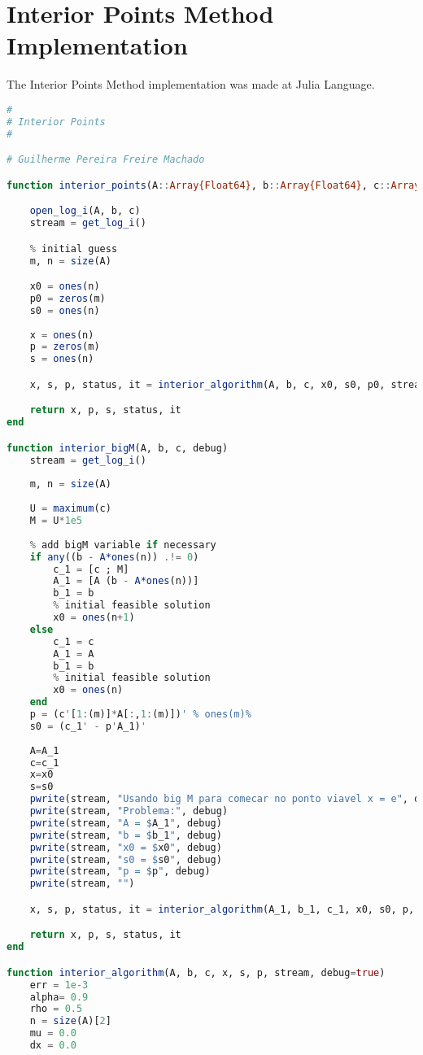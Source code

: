 \documentclass[a4paper]{IEEEtran}
\begin{document}
\section{Interior Points Method Implementation}
\label{appendix:A}

The Interior Points Method implementation was made at Julia Language.
\begin{lstlisting}[language=Julia,numbers=none]
#
# Interior Points
#

# Guilherme Pereira Freire Machado

function interior_points(A::Array{Float64}, b::Array{Float64}, c::Array{Float64}, debug=true)

    open_log_i(A, b, c)
    stream = get_log_i()

    % initial guess
    m, n = size(A)

    x0 = ones(n)
    p0 = zeros(m)
    s0 = ones(n)
    
    x = ones(n)
    p = zeros(m)
    s = ones(n)

    x, s, p, status, it = interior_algorithm(A, b, c, x0, s0, p0, stream, debug)

    return x, p, s, status, it
end

function interior_bigM(A, b, c, debug)
    stream = get_log_i()
    
    m, n = size(A)
    
    U = maximum(c)
    M = U*1e5
    
    % add bigM variable if necessary
    if any((b - A*ones(n)) .!= 0)
        c_1 = [c ; M]
        A_1 = [A (b - A*ones(n))]
        b_1 = b
        % initial feasible solution
        x0 = ones(n+1)
    else
        c_1 = c
        A_1 = A
        b_1 = b
        % initial feasible solution
        x0 = ones(n)
    end
    p = (c'[1:(m)]*A[:,1:(m)])' % ones(m)%
    s0 = (c_1' - p'A_1)'
    
    A=A_1
    c=c_1
    x=x0
    s=s0
    pwrite(stream, "Usando big M para comecar no ponto viavel x = e", debug)
    pwrite(stream, "Problema:", debug)
    pwrite(stream, "A = $A_1", debug)
    pwrite(stream, "b = $b_1", debug)
    pwrite(stream, "x0 = $x0", debug)
    pwrite(stream, "s0 = $s0", debug)
    pwrite(stream, "p = $p", debug)
    pwrite(stream, "")

    x, s, p, status, it = interior_algorithm(A_1, b_1, c_1, x0, s0, p, stream, debug)

    return x, p, s, status, it
end 

function interior_algorithm(A, b, c, x, s, p, stream, debug=true)
    err = 1e-3
    alpha= 0.9
    rho = 0.5
    n = size(A)[2]
    mu = 0.0
    dx = 0.0


\end{lstlisting}
\end{document}
